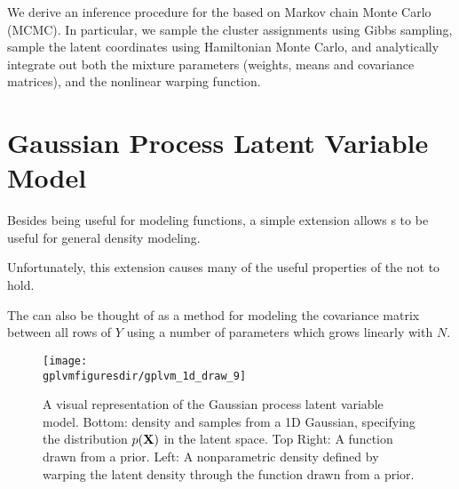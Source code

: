 We derive an inference procedure for the \iwmm{} based on Markov chain Monte Carlo (MCMC).  In particular, we sample the cluster assignments using Gibbs sampling, sample the latent coordinates using Hamiltonian Monte Carlo, and analytically integrate out both the mixture parameters (weights, means and covariance matrices), and the nonlinear warping function. 






\section{Gaussian Process Latent Variable Model}


Besides being useful for modeling functions, a simple extension allows \gp{}s to be useful for general density modeling.  



Unfortunately, this extension causes many of the useful properties of the \gp{} not to hold.

The \gplvm{} can also be thought of as a method for modeling the covariance matrix between all rows of $Y$ using a number of parameters which grows linearly with $N$.


\begin{figure}[t]
\begin{centering}
\texttt{[image: \\gplvmfiguresdir/gplvm\_1d\_draw\_9]}
\end{centering}
\caption[One-dimensional Gaussian process latent variable model]{A visual representation of the Gaussian process latent variable model.  Bottom: density and samples from a 1D Gaussian, specifying the distribution $p(\mathbf{X})$ in the latent space.  Top Right: A function drawn from a \gp{} prior.  Left: A nonparametric density defined by warping the latent density through the function drawn from a \gp{} prior.}  
\label{fig:oned-gplvm}
\end{figure}



